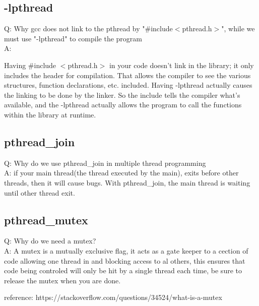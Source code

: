 \documentclass{article}
\begin{document}
\subsection{-lpthread}
Q: Why gcc does not link to the pthread by "\#include$<$pthread.h$>$", while we must use "-lpthread"
to compile the program
\\
A: 

Having \#include $<$pthread.h$>$ in your code doesn't link in the library; it only includes the header for compilation. That allows the compiler to see the various structures, function declarations, etc. included. Having -lpthread actually causes the linking to be done by the linker. So the include tells the compiler what's available, and the -lpthread actually allows the program to call the functions within the library at runtime.
\subsection{pthread\_join}
Q: Why do we use pthread\_join in multiple thread programming
\\
A: if your main thread(the thread executed by the main), exits before other threads, then it will cause bugs. With pthread\_join, the main thread is waiting until other thread exit.

\subsection{pthread\_mutex}
Q: Why do we need a mutex?
\\
A:
A mutex is a mutually exclusive flag, it acts as a gate keeper to a cection of code allowing one thread in and blocking access to al others, this ensures that code being controled will only be hit by a single thread each time, be sure to release the mutex when you are done.

reference: https://stackoverflow.com/questions/34524/what-is-a-mutex
\end{document}
